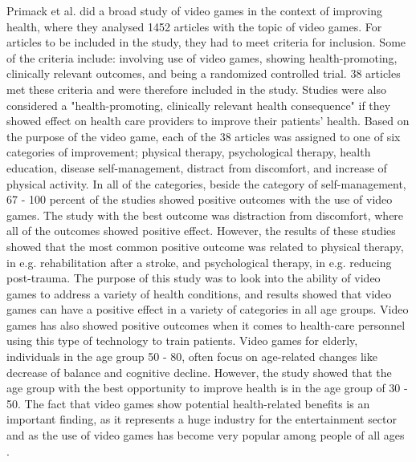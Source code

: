 Primack et al. \cite{roleofvideogames} did a broad study of video games in the context of improving health, where they analysed 1452 articles with the topic of video games.  For articles to be included in the study, they had to meet criteria for inclusion. Some of the criteria include: involving use of video games, showing health-promoting, clinically relevant outcomes, and being a randomized controlled trial. 38 articles met these criteria and were therefore included in the study. Studies were also considered a "health-promoting, clinically relevant health consequence" if they showed effect on health care providers to improve their patients' health. Based on the purpose of the video game, each of the 38 articles was assigned to one of six categories of improvement; physical therapy, psychological therapy, health education, disease self-management, distract from discomfort, and increase of physical activity. In all of the categories, beside the category of self-management, 67 - 100 percent of the studies showed positive outcomes with the use of video games. The study with the best outcome was distraction from discomfort, where all of the outcomes showed positive effect. However, the results of these studies showed that the most common positive outcome was related to physical therapy, in e.g. rehabilitation after a stroke, and psychological therapy, in e.g. reducing post-trauma. The purpose of this study was to look into the ability of video games to address a variety of health conditions, and results showed that video games can have a positive effect in a variety of categories in all age groups. Video games has also showed positive outcomes when it comes to health-care personnel using this type of technology to train patients. Video games for elderly, individuals in the age group 50 - 80, often focus on age-related changes like decrease of balance and cognitive decline. However, the study showed that the age group with the best opportunity to improve health is in the age group of 30 - 50. The fact that video games show potential health-related benefits is an important finding, as it represents a huge industry for the entertainment sector and as the use of video games has become very popular among people of all ages \cite{roleofvideogames}. \\ \\
